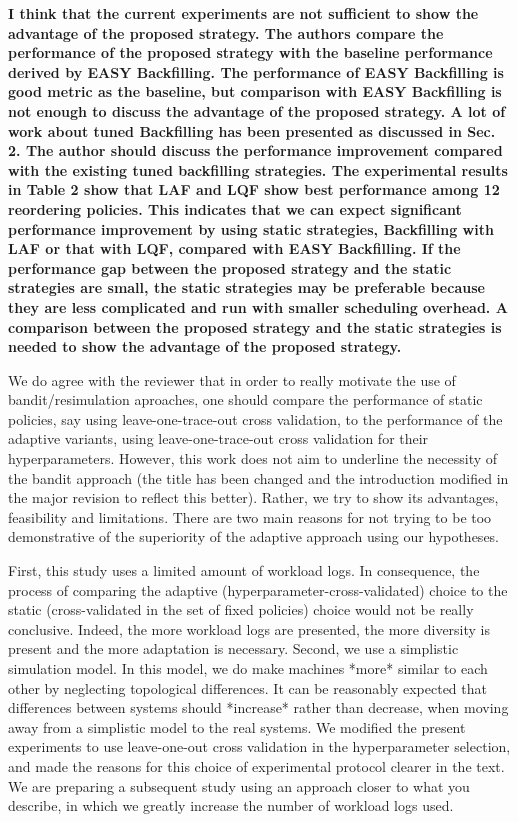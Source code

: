 \documentclass[]{article}
\begin{document}
\textbf{I think that the current experiments are not sufficient to show the advantage of the proposed strategy.
The authors compare the performance of the proposed strategy with the baseline performance derived by EASY Backfilling. The performance of EASY Backfilling is good metric as the baseline, but comparison with EASY Backfilling is not enough to discuss the advantage of the proposed strategy. A lot of work about tuned Backfilling has been presented as discussed in Sec. 2. The author should discuss the performance improvement compared with the existing tuned backfilling strategies.
The experimental results in Table 2 show that LAF and LQF show best performance among 12 reordering policies. This indicates that we can expect significant performance improvement by using static strategies, Backfilling with LAF or that with LQF, compared with EASY Backfilling. If the performance gap between the proposed strategy and the static strategies are small, the static strategies may be preferable because they are less complicated and run with smaller scheduling overhead. A comparison between the proposed strategy and the static strategies is needed to show the advantage of the proposed strategy.}

We do agree with the reviewer that in order to really motivate the use of
bandit/resimulation aproaches, one should compare the performance of static
policies, say using leave-one-trace-out cross validation, to the performance of
the adaptive variants, using leave-one-trace-out cross validation for their
hyperparameters.
However, this work does not aim to underline the necessity of the bandit
approach (the title has been changed and the introduction modified in the major
revision to reflect this better). Rather, we try to show its advantages,
feasibility and limitations. 
There are two main reasons for not trying to be too demonstrative of the superiority
of the adaptive approach using our hypotheses.

First, this study uses a limited amount of workload logs. In consequence, the
process of comparing the adaptive (hyperparameter-cross-validated) choice to
the static (cross-validated in the set of fixed policies) choice would not be
really conclusive.  Indeed, the more workload logs are presented, the more
diversity is present and the more adaptation is necessary.
Second, we use a simplistic simulation model. In this model, we do make
machines *more* similar to each other by neglecting topological differences. It
can be reasonably expected that differences between systems should *increase*
rather than decrease, when moving away from a simplistic model to the real
systems.
We modified the present experiments to use leave-one-out cross
validation in the hyperparameter selection, and made the reasons for this
choice of experimental protocol clearer in the text.
We are preparing a subsequent study using an approach closer to what you
describe, in which we greatly increase the number of workload logs used.\\
\end{document}
